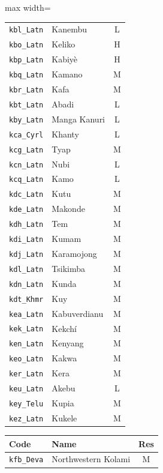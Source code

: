{\begin{adjustbox}{max width=\textwidth}
\begin{tabular}{llc}
        \texttt{kbl\_Latn} & Kanembu & L \\
        \texttt{kbo\_Latn} & Keliko & H \\
        \texttt{kbp\_Latn} & Kabiyè & H \\
        \texttt{kbq\_Latn} & Kamano & M \\
        \texttt{kbr\_Latn} & Kafa & M \\
        \texttt{kbt\_Latn} & Abadi & L \\
        \texttt{kby\_Latn} & Manga Kanuri & L \\
        \texttt{kca\_Cyrl} & Khanty & L \\
        \texttt{kcg\_Latn} & Tyap & M \\
        \texttt{kcn\_Latn} & Nubi & L \\
        \texttt{kcq\_Latn} & Kamo & L \\
        \texttt{kdc\_Latn} & Kutu & M \\
        \texttt{kde\_Latn} & Makonde & M \\
        \texttt{kdh\_Latn} & Tem & M \\
        \texttt{kdi\_Latn} & Kumam & M \\
        \texttt{kdj\_Latn} & Karamojong & M \\
        \texttt{kdl\_Latn} & Tsikimba & M \\
        \texttt{kdn\_Latn} & Kunda & M \\
        \texttt{kdt\_Khmr} & Kuy & M \\
        \texttt{kea\_Latn} & Kabuverdianu & M \\
        \texttt{kek\_Latn} & Kekchí & M \\
        \texttt{ken\_Latn} & Kenyang & M \\
        \texttt{keo\_Latn} & Kakwa & M \\
        \texttt{ker\_Latn} & Kera & M \\
        \texttt{keu\_Latn} & Akebu & L \\
        \texttt{key\_Telu} & Kupia & M \\
        \texttt{kez\_Latn} & Kukele & M \\
        \bottomrule
    \end{tabular}
    \quad
    \begin{tabular}{llc}
        \toprule
        \textbf{Code} & \textbf{Name} & \textbf{Res}\\
        \midrule
        \texttt{kfb\_Deva} & Northwestern Kolami & M \\

\end{tabular}
\end{adjustbox}}
